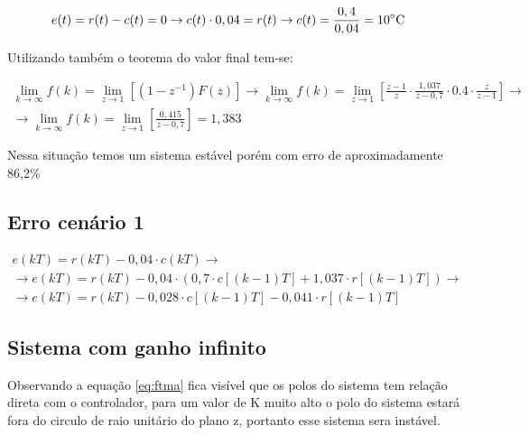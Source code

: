 \documentclass[a4paper,12pt]{article}
\begin{document}
			\begin{equation}
				\left.
				\begin{array}{c}
					\displaystyle e(t)= r(t) - c(t) = 0 \rightarrow c(t) \cdot 0,04 = r(t) \rightarrow c(t) = \frac{0,4}{0,04} = 10 \celsius
				\end{array}
				\right.
				\quad 
			\end{equation}
			
			Utilizando também o teorema do valor final tem-se:
			
			\begin{equation}
				\left.
				\begin{array}{c}
					\displaystyle \lim_{k \to \infty}f(k) = \lim_{z \to 1}\left[(1-z^{-1})F(z) \right] \rightarrow \lim_{k \to \infty}f(k) = \lim_{z \to 1}\left[ \frac{z-1}{z} \cdot \frac{1,037}{z - 0,7} \cdot 0.4 \cdot \frac{z}{z-1}  \right] \rightarrow \\[20pt]
					
					\displaystyle \rightarrow \lim_{k \to \infty}f(k) =  \lim_{z \to 1}\left[  \frac{0,415}{z - 0,7}  \right] = 1,383
				\end{array}
				\right.
				\quad 
			\end{equation}
			
			Nessa situação temos um sistema estável porém com erro de aproximadamente 86,2\%
			
			
		\subsection{Erro cenário 1}
			
			\begin{equation}
				\left.
				\begin{array}{c}
					\displaystyle e(kT) = r(kT) - 0,04 \cdot c(kT) \rightarrow \\[20pt]
					\displaystyle \rightarrow e(kT) = r(kT) - 0,04 \cdot (0,7\cdot c[(k-1)T] + 1,037 \cdot r[(k-1)T]) \rightarrow \\[20pt]
					\displaystyle \rightarrow e(kT) = r(kT) - 0,028 \cdot c[(k-1)T] - 0,041\cdot r[(k-1)T]
				\end{array}
				\right.
				\quad 
			\end{equation}
			
		\subsection{Sistema com ganho infinito}
			Observando a equação \ref{eq:ftma} fica visível que os polos do sistema tem relação direta com o controlador, para um valor de K muito alto o polo do sistema estará fora do circulo de raio unitário do plano z, portanto esse sistema sera instável.
			
\end{document}
